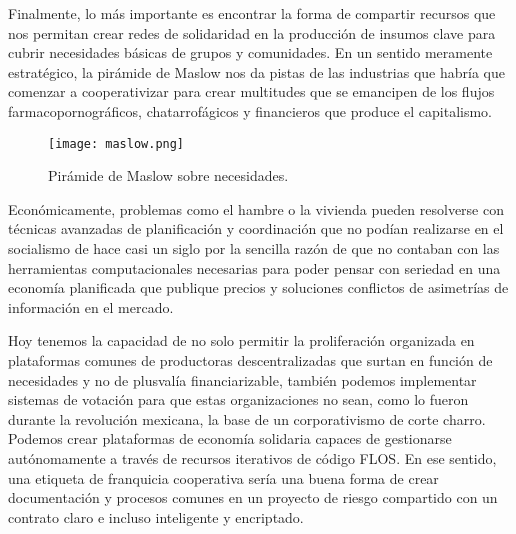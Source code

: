 Finalmente, lo más importante es encontrar la forma de compartir recursos que nos permitan crear redes de solidaridad en la producción de insumos clave para cubrir necesidades básicas de grupos y comunidades. En un sentido meramente estratégico, la pirámide de Maslow nos da pistas de las industrias que habría que comenzar a cooperativizar para crear multitudes que se emancipen de los flujos farmacopornográficos, chatarrofágicos y financieros que produce el capitalismo.

\begin{figure}[htbp]
	\centering
	\texttt{[image: maslow.png]}
	\caption{Pirámide de Maslow sobre necesidades.}
	\label{fig:maslow}
\end{figure}

Económicamente, problemas como el hambre o la vivienda pueden resolverse con técnicas avanzadas de planificación y coordinación que no podían realizarse en el socialismo de hace casi un siglo por la sencilla razón de que no contaban con las herramientas computacionales necesarias para poder pensar con seriedad en una economía planificada que publique precios y soluciones conflictos de asimetrías de información en el mercado.

Hoy tenemos la capacidad de no solo permitir la proliferación organizada en plataformas comunes de productoras descentralizadas que surtan en función de necesidades y no de plusvalía financiarizable, también podemos implementar sistemas de votación para que estas organizaciones no sean, como lo fueron durante la revolución mexicana, la base de un corporativismo de corte charro. Podemos crear plataformas de economía solidaria capaces de gestionarse autónomamente a través de recursos iterativos de código FLOS. En ese sentido, una etiqueta de franquicia cooperativa sería una buena forma de crear documentación y procesos comunes en un proyecto de riesgo compartido con un contrato claro e incluso inteligente y encriptado.
